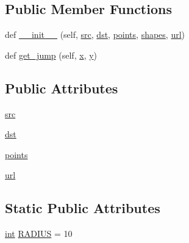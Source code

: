 \subsection*{Public Member Functions}
\begin{DoxyCompactItemize}
\item 
def \hyperlink{classsmacc__viewer_1_1xdot_1_1xdot__qt_1_1Edge_a738644d11d4efe78c3295a5a9ca15515}{\+\_\+\+\_\+init\+\_\+\+\_\+} (self, \hyperlink{classsmacc__viewer_1_1xdot_1_1xdot__qt_1_1Edge_a5689e7ea2be54c94ae961b28c75199da}{src}, \hyperlink{classsmacc__viewer_1_1xdot_1_1xdot__qt_1_1Edge_ac3d671e3f4486291b249df4608b775b5}{dst}, \hyperlink{classsmacc__viewer_1_1xdot_1_1xdot__qt_1_1Edge_ac0a98c09c470ac737011283bb9e6108e}{points}, \hyperlink{classsmacc__viewer_1_1xdot_1_1xdot__qt_1_1CompoundShape_ad2f848b99323a9a844ffa4769737f69e}{shapes}, \hyperlink{classsmacc__viewer_1_1xdot_1_1xdot__qt_1_1Edge_acadf98140ce469bcbf1856232220ead7}{url})
\item 
def \hyperlink{classsmacc__viewer_1_1xdot_1_1xdot__qt_1_1Edge_a6cff1a5dcb4d832e98cdc92ddb130d9e}{get\+\_\+jump} (self, \hyperlink{namespacesmacc__viewer_1_1xdot_1_1xdot__qt_a1dd3d4e1f636ed9ebbed9b32d4c196df}{x}, \hyperlink{namespacesmacc__viewer_1_1xdot_1_1xdot__qt_a784c76c541d5dd5940e217a1aa54f256}{y})
\end{DoxyCompactItemize}
\subsection*{Public Attributes}
\begin{DoxyCompactItemize}
\item 
\hyperlink{classsmacc__viewer_1_1xdot_1_1xdot__qt_1_1Edge_a5689e7ea2be54c94ae961b28c75199da}{src}
\item 
\hyperlink{classsmacc__viewer_1_1xdot_1_1xdot__qt_1_1Edge_ac3d671e3f4486291b249df4608b775b5}{dst}
\item 
\hyperlink{classsmacc__viewer_1_1xdot_1_1xdot__qt_1_1Edge_ac0a98c09c470ac737011283bb9e6108e}{points}
\item 
\hyperlink{classsmacc__viewer_1_1xdot_1_1xdot__qt_1_1Edge_acadf98140ce469bcbf1856232220ead7}{url}
\end{DoxyCompactItemize}
\subsection*{Static Public Attributes}
\begin{DoxyCompactItemize}
\item 
\hyperlink{classint}{int} \hyperlink{classsmacc__viewer_1_1xdot_1_1xdot__qt_1_1Edge_ad7c0b0732d1f024cf4bd1e379dd8d470}{R\+A\+D\+I\+US} = 10
\end{DoxyCompactItemize}


